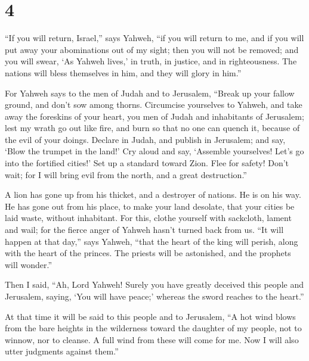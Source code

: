 \hypertarget{section-3}{%
\section{4}\label{section-3}}

 ``If you will return, Israel,'' says Yahweh, ``if you
will return to me, and if you will put away your abominations out of my
sight; then you will not be removed;  and you will swear,
`As Yahweh lives,' in truth, in justice, and in righteousness. The
nations will bless themselves in him, and they will glory in him.''

 For Yahweh says to the men of Judah and to Jerusalem,
``Break up your fallow ground, and don't sow among thorns.
 Circumcise yourselves to Yahweh, and take away the
foreskins of your heart, you men of Judah and inhabitants of Jerusalem;
lest my wrath go out like fire, and burn so that no one can quench it,
because of the evil of your doings.  Declare in Judah, and
publish in Jerusalem; and say, `Blow the trumpet in the land!' Cry aloud
and say, `Assemble yourselves! Let's go into the fortified cities!'
 Set up a standard toward Zion. Flee for safety! Don't
wait; for I will bring evil from the north, and a great destruction.''

 A lion has gone up from his thicket, and a destroyer of
nations. He is on his way. He has gone out from his place, to make your
land desolate, that your cities be laid waste, without inhabitant.
 For this, clothe yourself with sackcloth, lament and
wail; for the fierce anger of Yahweh hasn't turned back from us.
 ``It will happen at that day,'' says Yahweh, ``that the
heart of the king will perish, along with the heart of the princes. The
priests will be astonished, and the prophets will wonder.''

 Then I said, ``Ah, Lord Yahweh! Surely you have greatly
deceived this people and Jerusalem, saying, `You will have peace;'
whereas the sword reaches to the heart.''

 At that time it will be said to this people and to
Jerusalem, ``A hot wind blows from the bare heights in the wilderness
toward the daughter of my people, not to winnow, nor to cleanse.
 A full wind from these will come for me. Now I will also
utter judgments against them.''


